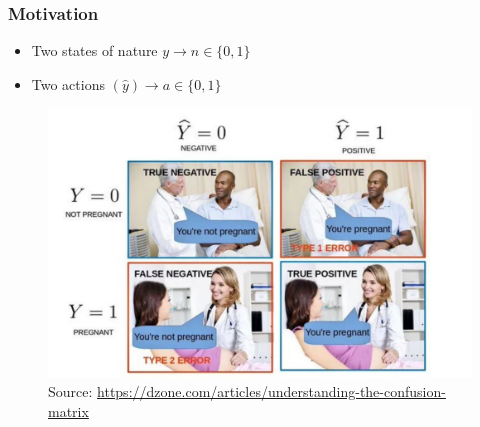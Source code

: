 \documentclass[
  shownotes,
  xcolor={svgnames},
  hyperref={colorlinks,citecolor=DarkBlue,linkcolor=DarkRed,urlcolor=DarkBlue}
  , aspectratio=169]{beamer}
\begin{document}
\begin{frame}[fragile]
\frametitle{Motivation}

\begin{itemize}
  \item Two states of nature $y \rightarrow n\in\{0,1\}$
  \medskip
  \item Two actions $(\hat{y}) \rightarrow a\in \{0,1\}$
\end{itemize}



        \begin{figure}[H] \centering
            \captionsetup{justification=centering}
              \includegraphics[scale=0.4]{figures/confusion_matrix}
              \\
              \tiny
              Source: \url{https://dzone.com/articles/understanding-the-confusion-matrix}
 \end{figure}

\end{frame}
\end{document}
